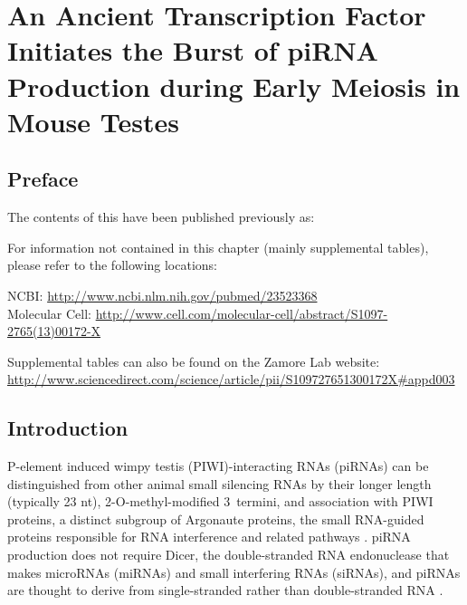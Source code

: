 \chapter{An Ancient Transcription Factor Initiates the Burst of piRNA Production during Early Meiosis in Mouse Testes} \label{MolCel} 

\section{Preface}
  \label{MolCel:sec:Preface}

  The contents of this have been published previously as:

  \begin{quote}
    \itshape 
    \singlespacing
    \end{quote}

  For information not contained in this chapter (mainly supplemental tables), please refer to the following locations: 

  NCBI: \url{http://www.ncbi.nlm.nih.gov/pubmed/23523368} \\
  Molecular Cell: \url{http://www.cell.com/molecular-cell/abstract/S1097-2765(13)00172-X}

  Supplemental tables can also be found on the Zamore Lab website: \url{http://www.sciencedirect.com/science/article/pii/S109727651300172X#appd003}

\section{Introduction}
  \label{MolCel:sec:Introduction}

  P-element induced wimpy testis (PIWI)-interacting RNAs (piRNAs) can be distinguished from other animal small silencing RNAs by their longer length (typically 23 nt), 2\textprime-O-methyl-modified 3\textprime~termini, and association with PIWI proteins, a distinct subgroup of Argonaute proteins, the small RNA-guided proteins responsible for RNA interference and related pathways \citep{Kumar1998,Farazi2008,Kim2009,Thomson2009,Cenik2011,Aravin2008}. piRNA production does not require Dicer, the double-stranded RNA endonuclease that makes microRNAs (miRNAs) and small interfering RNAs (siRNAs), and piRNAs are thought to derive from single-stranded rather than double-stranded RNA \citep{Vagin2006, Houwing2007}.

